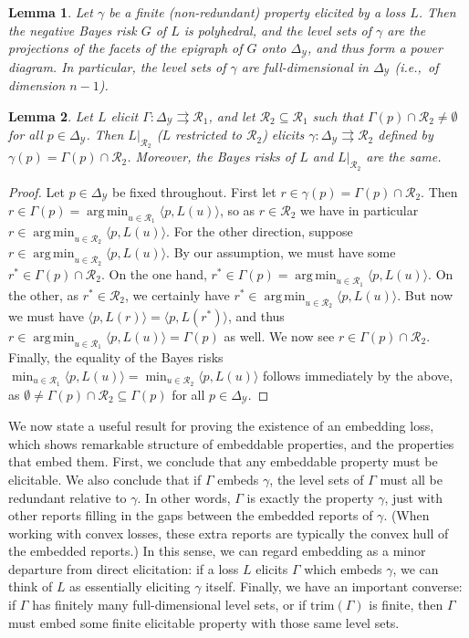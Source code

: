 \documentclass[12pt]{article}
\newcommand{\simplex}{\Delta_\Y}
\newcommand{\R}{\mathcal{R}}
\newcommand{\Y}{\mathcal{Y}}
\newcommand{\inprod}[2]{\langle #1, #2 \rangle}%
\newcommand{\toto}{\rightrightarrows}
\newcommand{\trim}{\mathrm{trim}}
\DeclareMathOperator*{\argmin}{arg\,min}
\newtheorem{lemma}{Lemma}
\begin{document}
\begin{lemma}\label{lem:finite-full-dim}
  Let $\gamma$ be a finite (non-redundant) property elicited by a loss $L$.
  Then the negative Bayes risk $G$ of $L$ is polyhedral, and the level sets of $\gamma$ are the projections of the facets of the epigraph of $G$ onto $\simplex$, and thus form a power diagram.
  In particular, the level sets of $\gamma$ are full-dimensional in $\simplex$ (i.e.,\ of dimension $n-1$).
\end{lemma}

\begin{lemma}\label{lem:loss-restrict}
  Let $L$ elicit $\Gamma:\simplex\toto\R_1$, and let $\R_2\subseteq\R_1$ such that $\Gamma(p) \cap \R_2 \neq \emptyset$ for all $p\in\simplex$.
  Then $L|_{\R_2}$ ($L$ restricted to $\R_2$) elicits $\gamma:\simplex\toto\R_2$ defined by $\gamma(p) = \Gamma(p)\cap \R_2$.
  Moreover, the Bayes risks of $L$ and $L|_{\R_2}$ are the same.
\end{lemma}
\begin{proof}
  Let $p\in\simplex$ be fixed throughout.
  First let $r \in \gamma(p) = \Gamma(p) \cap \R_2$.
  Then $r \in \Gamma(p) = \argmin_{u\in\R_1} \inprod{p}{L(u)}$, so as $r\in\R_2$ we have in particular $r \in \argmin_{u\in\R_2} \inprod{p}{L(u)}$.
  For the other direction, suppose $r \in \argmin_{u\in\R_2} \inprod{p}{L(u)}$.
  By our assumption, we must have some $r^* \in \Gamma(p) \cap \R_2$.
  On the one hand, $r^*\in\Gamma(p) = \argmin_{u\in\R_1} \inprod{p}{L(u)}$.
  On the other, as $r^* \in \R_2$, we certainly have $r^* \in \argmin_{u\in\R_2} \inprod{p}{L(u)}$.
  But now we must have $\inprod{p}{L(r)} = \inprod{p}{L(r^*)}$, and thus $r \in \argmin_{u\in\R_1} \inprod{p}{L(u)} = \Gamma(p)$ as well.
  We now see $r \in \Gamma(p) \cap \R_2$.
  Finally, the equality of the Bayes risks $\min_{u\in\R_1} \inprod{p}{L(u)} = \min_{u\in\R_2} \inprod{p}{L(u)}$ follows immediately by the above, as $\emptyset \neq \Gamma(p)\cap\R_2 \subseteq \Gamma(p)$ for all $p\in\simplex$.
\end{proof}

We now state a useful result for proving the existence of an embedding loss, which shows remarkable structure of embeddable properties, and the properties that embed them.
First, we conclude that any embeddable property must be elicitable.
We also conclude that if $\Gamma$ embeds $\gamma$, the level sets of $\Gamma$ must all be redundant relative to $\gamma$.
In other words, $\Gamma$ is exactly the property $\gamma$, just with other reports filling in the gaps between the embedded reports of $\gamma$.
(When working with convex losses, these extra reports are typically the convex hull of the embedded reports.)
In this sense, we can regard embedding as a minor departure from direct elicitation: if a loss $L$ elicits $\Gamma$ which embeds $\gamma$, we can think of $L$ as essentially eliciting $\gamma$ itself.
Finally, we have an important converse: if $\Gamma$ has finitely many full-dimensional level sets, or if $\trim(\Gamma)$ is finite, then $\Gamma$ must embed some finite elicitable property with those same level sets.
\end{document}
